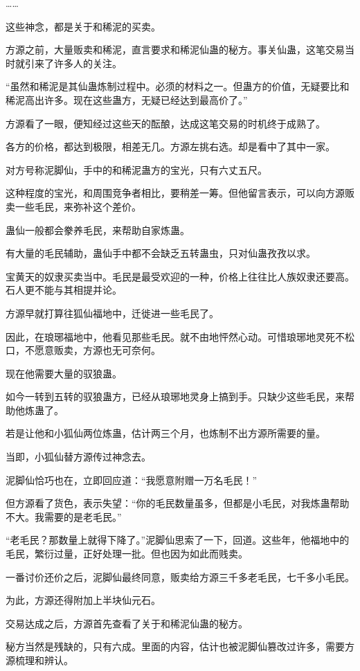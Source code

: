 \begin{this_body}
……

这些神念，都是关于和稀泥的买卖。

方源之前，大量贩卖和稀泥，直言要求和稀泥仙蛊的秘方。事关仙蛊，这笔交易当时就引来了许多人的关注。

“虽然和稀泥是其仙蛊炼制过程中。必须的材料之一。但蛊方的价值，无疑要比和稀泥高出许多。现在这些蛊方，无疑已经达到最高价了。”

方源看了一眼，便知经过这些天的酝酿，达成这笔交易的时机终于成熟了。

各方的价格，都达到极限，相差无几。方源左挑右选。却是看中了其中一家。

对方号称泥脚仙，手中的和稀泥蛊方的宝光，只有六丈五尺。

这种程度的宝光，和周围竞争者相比，要稍差一筹。但他留言表示，可以向方源贩卖一些毛民，来弥补这个差价。

蛊仙一般都会豢养毛民，来帮助自家炼蛊。

有大量的毛民辅助，蛊仙手中都不会缺乏五转蛊虫，只对仙蛊孜孜以求。

宝黄天的奴隶买卖当中。毛民是最受欢迎的一种，价格上往往比人族奴隶还要高。石人更不能与其相提并论。

方源早就打算往狐仙福地中，迁徙进一些毛民了。

因此，在琅琊福地中，他看见那些毛民。就不由地怦然心动。可惜琅琊地灵死不松口，不愿意贩卖，方源也无可奈何。

现在他需要大量的驭狼蛊。

如今一转到五转的驭狼蛊方，已经从琅琊地灵身上搞到手。只缺少这些毛民，来帮助他炼蛊了。

若是让他和小狐仙两位炼蛊，估计两三个月，也炼制不出方源所需要的量。

当即，小狐仙替方源传过神念去。

泥脚仙恰巧也在，立即回应道：“我愿意附赠一万名毛民！”

但方源看了货色，表示失望：“你的毛民数量虽多，但都是小毛民，对我炼蛊帮助不大。我需要的是老毛民。”

“老毛民？那数量上就得下降了。”泥脚仙思索了一下，回道。这些年，他福地中的毛民，繁衍过量，正好处理一批。但也因为如此而贱卖。

一番讨价还价之后，泥脚仙最终同意，贩卖给方源三千多老毛民，七千多小毛民。

为此，方源还得附加上半块仙元石。

交易达成之后，方源首先查看了关于和稀泥仙蛊的秘方。

秘方当然是残缺的，只有六成。里面的内容，估计也被泥脚仙篡改过许多，需要方源梳理和辨认。


\end{this_body}
